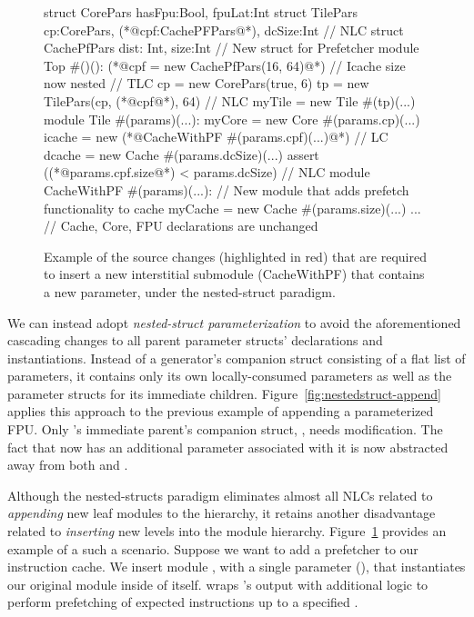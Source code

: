\begin{figure}
\centering
\begin{phdl}
struct CorePars {hasFpu:Bool, fpuLat:Int}
struct TilePars {cp:CorePars, (*@\textcolor[rgb]{1,0,0}{cpf:CachePFPars}@*), dcSize:Int}      // NLC
struct CachePfPars {dist: Int, size:Int} // New struct for Prefetcher
module Top #()():
  (*@\textcolor[rgb]{1,0,0}{cpf = new CachePfPars(16, 64)}@*)  // Icache size now nested      // TLC
  cp = new CorePars(true, 6)
  tp = new TilePars(cp, (*@\textcolor[rgb]{1,0,0}{cpf}@*), 64)                                // NLC
  myTile = new Tile #(tp)(...)
module Tile #(params)(...):
  myCore = new Core  #(params.cp)(...)
  icache = new (*@\textcolor[rgb]{1,0,0}{CacheWithPF \#(params.cpf)(...)}@*)                   // LC
  dcache = new Cache #(params.dcSize)(...)
  assert ((*@\textcolor[rgb]{1,0,0}{params.cpf.size}@*) < params.dcSize)                      // NLC
module CacheWithPF #(params)(...):  // New module that adds prefetch functionality to cache
  myCache = new Cache #(params.size)(...)
... // Cache, Core, FPU declarations are unchanged
\end{phdl} 
\caption{Example of the source changes (highlighted in red) that are required to insert a new interstitial submodule (CacheWithPF) that contains a new parameter,
under the nested-struct paradigm.}
\label{fig:nestedstruct-insert}
\end{figure}

We can instead adopt \emph{nested-struct parameterization} to avoid the aforementioned cascading changes to all parent parameter structs' declarations and instantiations. 
Instead of a generator's companion struct consisting of a flat list of parameters, it contains only its own locally-consumed parameters as well as the parameter structs for its immediate children. 
Figure~\ref{fig:nestedstruct-append} applies this approach to the previous example of appending a parameterized FPU.
Only 's immediate parent's companion struct, , needs modification.
The fact that  now has an additional parameter associated with it is now abstracted away from both  and .

Although the nested-structs paradigm eliminates almost all NLCs related to {\em appending} new leaf modules to the hierarchy,
it retains another disadvantage related to {\em inserting} new levels into the module hierarchy.
Figure~\ref{fig:nestedstruct-insert} provides an example of a such a scenario.
Suppose we want to add a prefetcher to our instruction cache. 
We insert module , with a single parameter (), that instantiates our original  module inside of itself.
 wraps 's output with additional logic to perform prefetching of expected instructions up to a specified .

